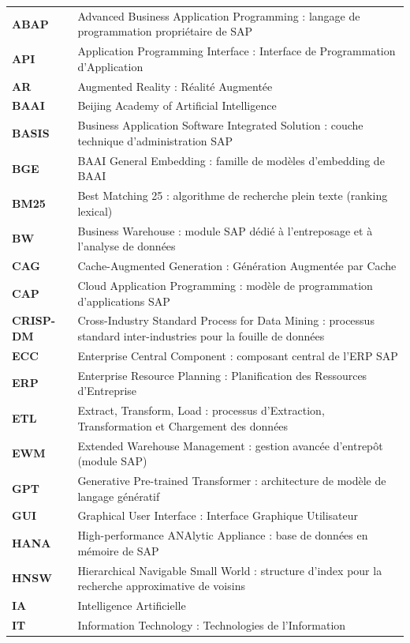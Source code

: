 \documentclass[12pt,a4paper]{report}
\begin{document}
\begin{longtable}{@{}>{\bfseries\color{primaryblue}}l @{\hspace{1.5cm}} p{11.2cm}@{}}
ABAP      & Advanced Business Application Programming : langage de programmation propriétaire de SAP \\
API       & Application Programming Interface : Interface de Programmation d'Application \\
AR        & Augmented Reality : Réalité Augmentée \\
BAAI      & Beijing Academy of Artificial Intelligence \\
BASIS     & Business Application Software Integrated Solution : couche technique d'administration SAP \\
BGE       & BAAI General Embedding :  famille de modèles d'embedding de BAAI \\
BM25      & Best Matching 25 : algorithme de recherche plein texte (ranking lexical) \\
BW        & Business Warehouse : module SAP dédié à l'entreposage et à l'analyse de données \\
CAG       & Cache-Augmented Generation : Génération Augmentée par Cache \\
CAP       & Cloud Application Programming : modèle de programmation d'applications SAP \\
CRISP-DM  & Cross-Industry Standard Process for Data Mining : processus standard inter-industries pour la fouille de données \\
ECC       & Enterprise Central Component : composant central de l'ERP SAP \\
ERP       & Enterprise Resource Planning : Planification des Ressources d'Entreprise \\
ETL       & Extract, Transform, Load : processus d'Extraction, Transformation et Chargement des données \\
EWM       & Extended Warehouse Management : gestion avancée d'entrepôt (module SAP) \\
GPT       & Generative Pre-trained Transformer : architecture de modèle de langage génératif \\
GUI       & Graphical User Interface : Interface Graphique Utilisateur \\
HANA      & High-performance ANAlytic Appliance : base de données en mémoire de SAP \\
HNSW      & Hierarchical Navigable Small World : structure d'index pour la recherche approximative de voisins \\
IA        & Intelligence Artificielle \\
IT        & Information Technology : Technologies de l'Information \\

\end{longtable}
\end{document}
